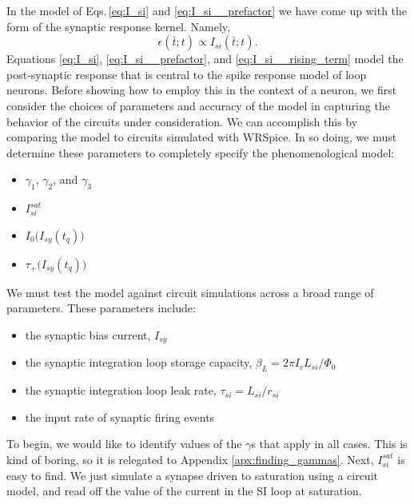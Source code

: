 \documentclass[]{article}
\begin{document}
In the model of Eqs.\,\ref{eq:I_si} and \ref{eq:I_si__prefactor} we have come up with the form of the synaptic response kernel. Namely, 
\begin{equation}
\label{eq:I_si__synaptic_response_kernel}
\epsilon(\bar{t};t) \propto I_{si}(\bar{t};t).
\end{equation}
Equations \ref{eq:I_si}, \ref{eq:I_si__prefactor}, and \ref{eq:I_si__rising_term} model the post-synaptic response that is central to the spike response model of loop neurons. Before showing how to employ this in the context of a neuron, we first consider the choices of parameters and accuracy of the model in capturing the behavior of the circuits under consideration. We can accomplish this by comparing the model to circuits simulated with WRSpice. In so doing, we must determine these parameters to completely specify the phenomenological model:
\begin{itemize}
\item $\gamma_1$, $\gamma_2$, and $\gamma_3$
\item $I_{si}^{sat}$
\item $I_0\big(I_{sy}(t_q)\big)$
\item $\tau_+\big(I_{sy}(t_q)\big)$
\end{itemize}

\vspace{1em}
\noindent We must test the model against circuit simulations across a broad range of parameters. These parameters include:
\begin{itemize}
\item the synaptic bias current, $I_{sy}$
\item the synaptic integration loop storage capacity, $\beta_L = 2\pi I_c L_{si}/\Phi_0$
\item the synaptic integration loop leak rate, $\tau_{si} = L_{si}/r_{si}$
\item the input rate of synaptic firing events
\end{itemize} 
To begin, we would like to identify values of the $\gamma$s that apply in all cases. This is kind of boring, so it is relegated to Appendix \ref{apx:finding_gammas}. Next, $I_{si}^{sat}$ is easy to find. We just simulate a synapse driven to saturation using a circuit model, and read off the value of the current in the SI loop at saturation. 
\end{document}
